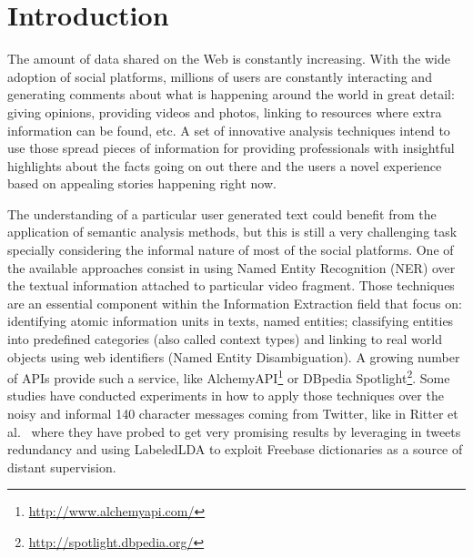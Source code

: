 \documentclass{sig-alternate}
\begin{document}



\section{Introduction}
\label{sec:introduction}
The amount of data shared on the Web is constantly increasing. With the wide adoption of social platforms, millions of users are constantly interacting and generating comments about what is happening around the world in great detail: giving opinions, providing videos and photos, linking to resources where extra information can be found, etc. A set of innovative analysis techniques intend to use those spread pieces of information for providing  professionals with insightful highlights about the facts going on out there and the users a novel experience based on appealing stories happening right now.

The understanding of a particular user generated text could benefit from the application of semantic analysis methods, but this is still a very challenging task specially considering the informal nature of most of the social platforms. One of the available approaches consist in using Named Entity Recognition (NER) over the textual information attached to particular video fragment. Those techniques are an essential component within the Information Extraction field that focus on: identifying atomic information units in texts, named entities; classifying entities into predefined categories (also called context types) and linking to real world objects using web identifiers (Named Entity Disambiguation). A growing number of APIs provide such a service, like AlchemyAPI\footnote{\fontsize{8pt}{1em}\selectfont \url{http://www.alchemyapi.com/}} or DBpedia Spotlight\footnote{\fontsize{8pt}{1em}\selectfont \url{http://spotlight.dbpedia.org/}}. Some studies have conducted experiments in how to apply those techniques over the noisy and informal 140 character messages coming from Twitter, like in Ritter et al.~\cite{Ritter2011} where they have probed to get very promising results by leveraging in tweets redundancy and using LabeledLDA to exploit Freebase dictionaries as a source of distant supervision. 
\end{document}
